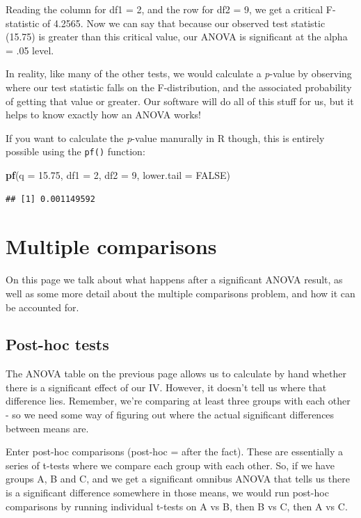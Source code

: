 \documentclass[
]{book}
\newenvironment{Shaded}{\begin{snugshade}}{\end{snugshade}}
\newcommand{\AttributeTok}[1]{\textcolor[rgb]{0.13,0.29,0.53}{#1}}
\newcommand{\ConstantTok}[1]{\textcolor[rgb]{0.56,0.35,0.01}{#1}}
\newcommand{\DecValTok}[1]{\textcolor[rgb]{0.00,0.00,0.81}{#1}}
\newcommand{\FloatTok}[1]{\textcolor[rgb]{0.00,0.00,0.81}{#1}}
\newcommand{\FunctionTok}[1]{\textcolor[rgb]{0.13,0.29,0.53}{\textbf{#1}}}
\newcommand{\NormalTok}[1]{#1}
\begin{document}
Reading the column for df1 = 2, and the row for df2 = 9, we get a
critical F-statistic of 4.2565. Now we can say that because our observed
test statistic (15.75) is greater than this critical value, our ANOVA is
significant at the alpha = .05 level.

In reality, like many of the other tests, we would calculate a \emph{p}-value
by observing where our test statistic falls on the F-distribution, and
the associated probability of getting that value or greater. Our
software will do all of this stuff for us, but it helps to know exactly
how an ANOVA works!

If you want to calculate the \emph{p}-value manurally in R though, this is entirely possible using the \texttt{pf()} function:

\begin{Shaded}
\begin{Highlighting}[]
\FunctionTok{pf}\NormalTok{(}\AttributeTok{q =} \FloatTok{15.75}\NormalTok{, }\AttributeTok{df1 =} \DecValTok{2}\NormalTok{, }\AttributeTok{df2 =} \DecValTok{9}\NormalTok{, }\AttributeTok{lower.tail =} \ConstantTok{FALSE}\NormalTok{)}
\end{Highlighting}
\end{Shaded}

\begin{verbatim}
## [1] 0.001149592
\end{verbatim}

\section{Multiple comparisons}\label{multiple-comparisons}

On this page we talk about what happens after a significant ANOVA
result, as well as some more detail about the multiple comparisons
problem, and how it can be accounted for.

\subsection{Post-hoc tests}\label{post-hoc-tests}

The ANOVA table on the previous page allows us to calculate by hand
whether there is a significant effect of our IV. However, it doesn't
tell us where that difference lies. Remember, we're comparing at least
three groups with each other - so we need some way of figuring out where
the actual significant differences between means are.

Enter post-hoc comparisons (post-hoc = after the fact). These are
essentially a series of t-tests where we compare each group with each
other. So, if we have groups A, B and C, and we get a significant
omnibus ANOVA that tells us there is a significant difference somewhere
in those means, we would run post-hoc comparisons by running individual
t-tests on A vs B, then B vs C, then A vs C.
\end{document}
